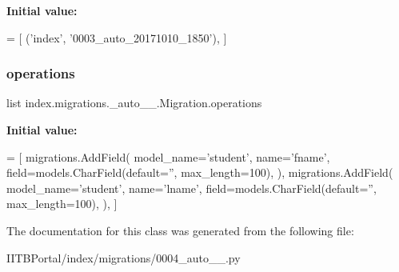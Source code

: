 {\bfseries Initial value\+:}
\begin{DoxyCode}
=  [
        (\textcolor{stringliteral}{'index'}, \textcolor{stringliteral}{'0003\_auto\_20171010\_1850'}),
    ]
\end{DoxyCode}
\mbox{\label{classindex_1_1migrations_1_10004__auto__20171010__1851_1_1Migration_ae25ddfc8e9785da955dbce3cd4c8996b}} 
\subsubsection{\texorpdfstring{operations}{operations}}
{\footnotesize\ttfamily list index.\+migrations.\+\_\+auto\+\_\+\_.\+Migration.\+operations\hspace{0.3cm}{\ttfamily [static]}}

{\bfseries Initial value\+:}
\begin{DoxyCode}
=  [
        migrations.AddField(
            model\_name=\textcolor{stringliteral}{'student'},
            name=\textcolor{stringliteral}{'fname'},
            field=models.CharField(default=\textcolor{stringliteral}{''}, max\_length=100),
        ),
        migrations.AddField(
            model\_name=\textcolor{stringliteral}{'student'},
            name=\textcolor{stringliteral}{'lname'},
            field=models.CharField(default=\textcolor{stringliteral}{''}, max\_length=100),
        ),
    ]
\end{DoxyCode}


The documentation for this class was generated from the following file\+:\begin{DoxyCompactItemize}
\item 
I\+I\+T\+B\+Portal/index/migrations/0004\+\_\+auto\+\_\+\_.\+py\end{DoxyCompactItemize}
